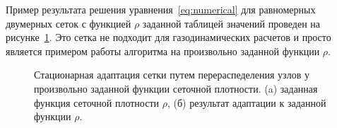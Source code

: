 Пример результата решения уравнения~\eqref{eq:numerical} для равномерных двумерных сеток с функцией $\rho$ заданной таблицей значений проведен на рисунке~\ref{fig:matroskin}. Это сетка не подходит для газодинамических расчетов и просто является примером работы алгоритма на произвольно заданной функции $\rho$.
\begin{figure}[b]
{\centering
	\hfill
}
\caption{Стационарная адаптация сетки путем перераспеделения узлов у произвольно заданной функции сеточной плотности. (a) заданная функция сеточной плотности $\rho$, (б) результат адаптации к заданной функции $\rho$.}
\label{fig:matroskin}
\end{figure}